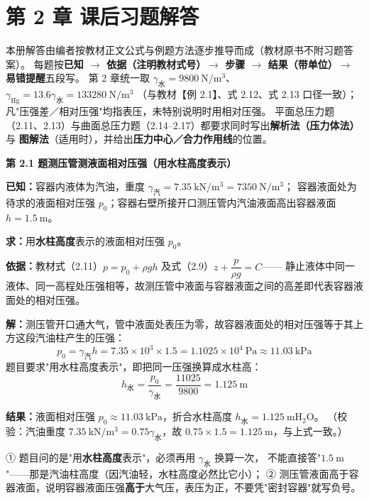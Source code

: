 \chapter*{第 2 章 课后习题解答}

\begin{tishi}
本册解答由编者按教材正文公式与例题方法逐步推导而成（教材原书不附习题答案）。
每题按\textbf{已知 $\to$ 依据（注明教材式号）$\to$ 步骤 $\to$ 结果（带单位）$\to$ 易错提醒}五段写。
第 2 章统一取 $\gamma_{\text{水}}=9800\ \mathrm{N/m^3}$、$\gamma_{\text{Hg}}=13.6\gamma_{\text{水}}=133280\ \mathrm{N/m^3}$
（与教材【例 2.1】、式 2.12、式 2.13 口径一致）；凡"压强差／相对压强"均指表压，未特别说明时用相对压强。
平面总压力题（2.11、2.13）与曲面总压力题（2.14--2.17）都要求同时写出\textbf{解析法（压力体法）}与
\textbf{图解法}（适用时），并给出\textbf{压力中心／合力作用线}的位置。
\end{tishi}

\noindent\textbf{第 2.1 题\quad 测压管测液面相对压强（用水柱高度表示）}

\begin{jie}
\textbf{已知：}容器内液体为汽油，重度 $\gamma_{\text{汽}}=7.35\ \mathrm{kN/m^3}=7350\ \mathrm{N/m^3}$；
容器液面处为待求的液面相对压强 $p_0$；容器右壁所接开口测压管内汽油液面高出容器液面 $h=1.5\ \mathrm{m}$。

\textbf{求：}用\textbf{水柱高度}表示的液面相对压强 $p_0$。

\textbf{依据：}教材式（2.11）$p=p_0+\rho gh$ 及式（2.9）$z+\dfrac{p}{\rho g}=C$——
静止液体中同一液体、同一高程处压强相等，故测压管中液面与容器液面之间的高差即代表容器液面处的相对压强。

\textbf{解：}测压管开口通大气，管中液面处表压为零，故容器液面处的相对压强等于其上方这段汽油柱产生的压强：
\[ p_0=\gamma_{\text{汽}}h=7.35\times10^3\times1.5=1.1025\times10^4\ \mathrm{Pa}\approx11.03\ \mathrm{kPa} \]
题目要求"用水柱高度表示"，即把同一压强换算成水柱高：
\[ h_{\text{水}}=\frac{p_0}{\gamma_{\text{水}}}=\frac{11025}{9800}=1.125\ \mathrm{m} \]

\textbf{结果：}液面相对压强 $p_0\approx11.03\ \mathrm{kPa}$，折合水柱高度 $h_{\text{水}}=1.125\ \mathrm{mH_2O}$。
（校验：汽油重度 $7.35\ \mathrm{kN/m^3}=0.75\gamma_{\text{水}}$，故 $0.75\times1.5=1.125\ \mathrm{m}$，与上式一致。）
\end{jie}

\begin{yicuo}
① 题目问的是"用\textbf{水柱高度}表示"，必须再用 $\gamma_{\text{水}}$ 换算一次，
不能直接答"$1.5\ \mathrm{m}$"——那是汽油柱高度（因汽油轻，水柱高度必然比它小）；
② 测压管液面高于容器液面，说明容器液面压强\textbf{高于}大气压，表压为正，不要凭"密封容器"就写负号。
\end{yicuo}

